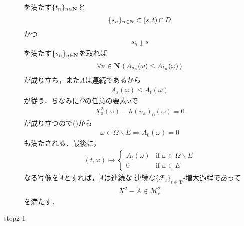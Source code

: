 \begin{sketch}
\begin{description}
				を満たす$\{t_n\}_{n \in \mathbf{N}}$と
				\begin{align}
					\{s_n\}_{n \in \mathbf{N}} \subset [s,t) \cap D
				\end{align}
				かつ
				\begin{align}
					s_n \downarrow s
				\end{align}
				を満たす$\{s_n\}_{n \in \mathbf{N}}$を取れば
				\begin{align}
					\forall n \in \mathbf{N}\, \left(\, A_{s_n}(\omega) \leq A_{t_n}(\omega)\, \right)
				\end{align}
				が成り立ち，また$A$は連続であるから
				\begin{align}
					A_s(\omega) \leq A_t(\omega)
				\end{align}
				が従う．ちなみに$\Omega$の任意の要素$\omega$で
				\begin{align}
					X^2_0(\omega) - h(n_k)_0(\omega) = 0
				\end{align}
				が成り立つので()から
				\begin{align}
					\omega \in \Omega \backslash E \Longrightarrow A_0(\omega) = 0
				\end{align}
				も満たされる．最後に，
				\begin{align}
					(t,\omega) \longmapsto
					\begin{cases}
						A_t(\omega) & \mbox{if } \omega \in \Omega \backslash E \\
						0 & \mbox{if } \omega \in E
					\end{cases}
				\end{align}
				なる写像を$\tilde{A}$とすれば，$\tilde{A}$は連続な
				連続な$\{\mathscr{F}_t\}_{t \in \mathbf{T}}$-増大過程であって
				\begin{align}
					X^2 - \tilde{A} \in \mathscr{M}_{c}^{2}
				\end{align}
				を満たす．
				
			\item[step2-1]
				

\end{description}
\end{sketch}
